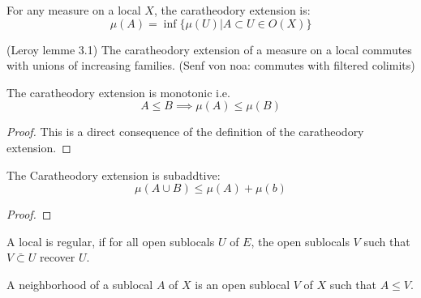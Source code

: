 \begin{definition}[Caratheodory]
    \leanok
    \label{def:caratheodory}
    For any measure on a local $X$, the caratheodory extension is:
    \[\mu(A) = \inf \{\mu(U) | A \subset U \in O(X)\}\]
\end{definition}

\begin{lemma}
(Leroy lemme 3.1)
    \label{lem:commutes_with_sup}
    \leanok
    The caratheodory extension of a measure on a local commutes with unions of increasing families.
    (Senf von noa: commutes with filtered colimits)
\end{lemma}

\begin{lemma}
    \label{lem:monotonic}
    \leanok
    The caratheodory extension is monotonic i.e. \[A \le B \implies \mu (A) \le \mu (B)\]
\end{lemma}
\begin{proof}
    \leanok
    This is a direct consequence of the definition of the caratheodory extension.
\end{proof}

\begin{lemma}[Subadditivity]
    \label{lem:caratheodory_subaddtive}
    The Caratheodory extension is subaddtive:
    $$\mu(A \cup B) \le \mu(A) + \mu(b)$$
    \leanok
\end{lemma}
\begin{proof}
    \leanok
\end{proof}

\begin{definition}
    \label{def:regular_local}
    \leanok
    A local is regular, if for all open sublocals $U$ of $E$, the open sublocals $V$ such that $V\bar \subset U$ recover $U$.
\end{definition}



\begin{definition}[Neighborhood]
    \label{def:neighborhood}
    \leanok

    A neighborhood of a sublocal $A$ of $X$ is an open sublocal $V$ of $X$ such that $A \le V$.
\end{definition}

